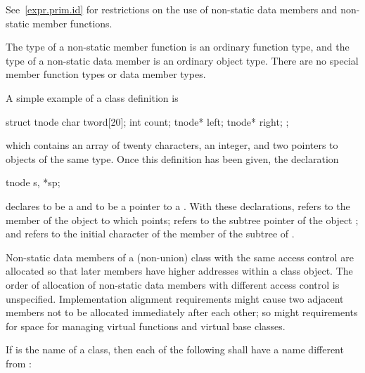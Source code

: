 \pnum
\begin{note}
See~\ref{expr.prim.id} for restrictions on the use of non-static data
members and non-static member functions.
\end{note}

\pnum
\begin{note}
The type of a non-static member function is an ordinary function type,
and the type of a non-static data member is an ordinary object type.
There are no special member function types or data member types.
\end{note}

\pnum
\begin{example}
A simple example of a class definition is

\begin{codeblock}
struct tnode {
  char tword[20];
  int count;
  tnode* left;
  tnode* right;
};
\end{codeblock}

which contains an array of twenty characters, an integer, and two
pointers to objects of the same type. Once this definition has been
given, the declaration

\begin{codeblock}
tnode s, *sp;
\end{codeblock}

declares  to be a  and  to be a pointer
to a . With these declarations,  refers to
the  member of the object to which  points;
 refers to the  subtree pointer of the object
; and  refers to the initial character
of the  member of the  subtree of .
\end{example}

\pnum
{}%
Non-static data members of a (non-union) class
with the same access control
are allocated so that later
members have higher addresses within a class object.
%
The order of allocation of non-static data members
with different access control
is unspecified.
Implementation alignment requirements might cause two adjacent members
not to be allocated immediately after each other; so might requirements
for space for managing virtual functions and
virtual base classes.

\pnum
If  is the name of a class, then each of the following shall
have a name different from :

